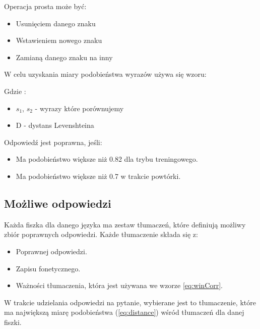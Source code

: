 Operacja prosta może być:
\begin{itemize}
	\item Usunięciem danego znaku
	\item Wstawieniem nowego znaku
	\item Zamianą danego znaku na inny
\end{itemize}

W celu uzyskania miary podobieństwa wyrazów używa się wzoru: 


Gdzie :
\begin{itemize} 
	\item $s_1$, $s_2$ - wyrazy które porównujemy
	\item D - dystans Levenshteina
\end{itemize}

\vspace{1cm}

Odpowiedź jest poprawna, jeśli:
\begin{itemize}
	\item Ma podobieństwo większe niż 0.82 dla trybu treningowego.
	\item Ma podobieństwo większe niż 0.7 w trakcie powtórki.
\end{itemize}

\subsection{Możliwe odpowiedzi}

Każda fiszka dla danego języka ma zestaw tłumaczeń, które definiują możliwy zbiór poprawnych odpowiedzi. Każde tłumaczenie składa się z:
\begin{itemize}
	\item Poprawnej odpowiedzi.
	\item Zapisu fonetycznego.
	\item Ważności tłumaczenia, która jest używana we wzorze \ref{eq:winCorr}.
\end{itemize}
W trakcie udzielania odpowiedzi na pytanie, wybierane jest to tłumaczenie, które ma największą miarę podobieństwa (\ref{eq:distance}) wśród tłumaczeń dla danej fiszki.

